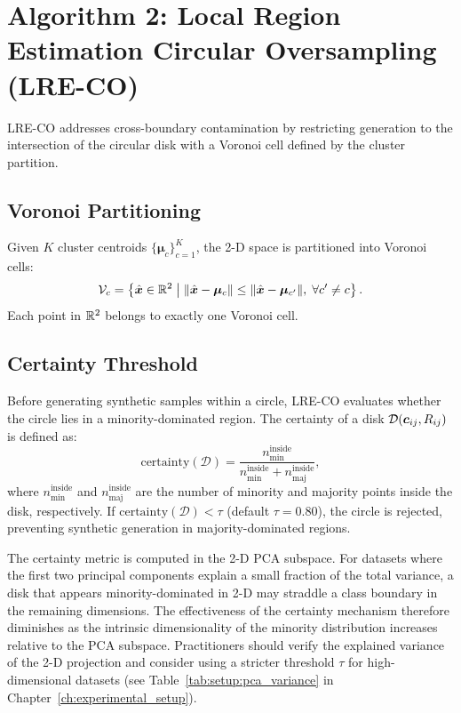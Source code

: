 \section{Algorithm 2: Local Region Estimation Circular Oversampling (LRE-CO)}
\label{sec:methods:lre_co}

LRE-CO addresses cross-boundary contamination by restricting generation to the intersection of the circular disk with a Voronoi cell defined by the cluster partition.

\subsection{Voronoi Partitioning}

Given $K$ cluster centroids $\{\boldsymbol{\mu}_c\}_{c=1}^K$, the 2-D space is partitioned into Voronoi cells:
\begin{equation}
    \mathcal{V}_c = \left\{\hat{\bm{x}} \in \mathbb{R}^2 \;\middle|\; \|\hat{\bm{x}} - \boldsymbol{\mu}_c\| \leq \|\hat{\bm{x}} - \boldsymbol{\mu}_{c'}\|,\; \forall c' \neq c\right\}.
    \label{eq:voronoi}
\end{equation}
Each point in $\mathbb{R}^2$ belongs to exactly one Voronoi cell.

\subsection{Certainty Threshold}

Before generating synthetic samples within a circle, LRE-CO evaluates whether the circle lies in a minority-dominated region.
The certainty of a disk $\mathcal{D}(\bm{c}_{ij}, R_{ij})$ is defined as:
\begin{equation}
    \mathrm{certainty}(\mathcal{D}) = \frac{n_{\min}^{\text{inside}}}{n_{\min}^{\text{inside}} + n_{\text{maj}}^{\text{inside}}},
    \label{eq:certainty}
\end{equation}
where $n_{\min}^{\text{inside}}$ and $n_{\text{maj}}^{\text{inside}}$ are the number of minority and majority points inside the disk, respectively.
If $\mathrm{certainty}(\mathcal{D}) < \tau$ (default $\tau = 0.80$), the circle is rejected, preventing synthetic generation in majority-dominated regions.

\begin{remark}[2-D Approximation]
The certainty metric is computed in the 2-D PCA subspace.
For datasets where the first two principal components explain a small fraction of the total variance, a disk that appears minority-dominated in 2-D may straddle a class boundary in the remaining dimensions.
The effectiveness of the certainty mechanism therefore diminishes as the intrinsic dimensionality of the minority distribution increases relative to the PCA subspace.
Practitioners should verify the explained variance of the 2-D projection and consider using a stricter threshold $\tau$ for high-dimensional datasets (see Table~\ref{tab:setup:pca_variance} in Chapter~\ref{ch:experimental_setup}).
\end{remark}

